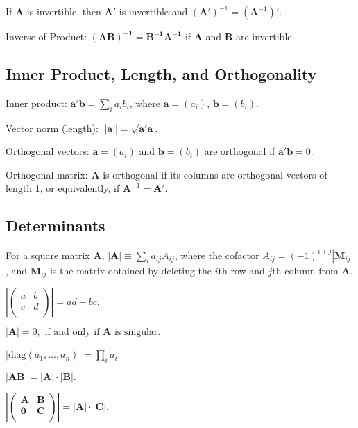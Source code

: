 \btheo
If ${\mathbf A}$ is invertible, then $\mathbf{A'}$ is invertible and $(\mathbf{A'})^{-1} = (\mathbf{A}^{-1})'$.
\etheo

\btheo
Inverse of Product: $\mathbf{(AB)^{-1}=B^{-1}A^{-1}}$ if $\mathbf A$
and $\mathbf B$ are invertible.
\etheo

\newpage
\subsection{Inner Product, Length, and Orthogonality}

\bdefi
Inner product: $\mathbf{a'b}=\sum_i a_i b_i$, where
$\mathbf{a}=(a_i)$, $\mathbf{b}=(b_i)$.
\esdefi

\bsdefi
Vector norm (length): $\mathbf{||a||=\sqrt{a'a}}$.
\esdefi

\bsdefi
Orthogonal vectors: $\mathbf{a}=(a_i)$ and $\mathbf{b}=(b_i)$ are
orthogonal if $\mathbf{a'b}=0$.
\esdefi

\bsdefi
Orthogonal matrix: $\mathbf A$ is orthogonal if its columns are
orthogonal vectors of length 1, or equivalently, if
$\mathbf{A}^{-1}=\mathbf{A}'$.
\edefi


\subsection{Determinants}

\bdefi
For a square matrix $\mathbf A$, $|\mathbf{A}|\equiv \sum_i
a_{ij}A_{ij}$, where the cofactor $A_{ij}=(-1)^{i+j}|\mathbf M_{ij}|$,
and $\mathbf M_{ij}$ is the matrix obtained by deleting the $i$th row
and $j$th column from $\mathbf A$.
\esdefi

\btheo
$\left|\left(\begin{array}{cc} a & b \\ c & d \\ \end{array}
\right)\right|= ad-bc.$
\estheo

\bstheo
$ |\mathbf{A}|=0, \mbox{ if and only if } \mathbf{A} \mbox{ is
singular}.$
\estheo

\bstheo
$|\mathrm{diag}(a_1,\ldots,a_n)|=\prod_i a_i$.
\estheo

\bstheo
$ |\mathbf{AB}| = |\mathbf A| \cdot |\mathbf B|.$
\estheo

\bstheo
$\left|\left(\begin{array}{cc} \mathbf{A} & \mathbf{B} \\ \mathbf{0} &
\mathbf{C} \\ \end{array}\right)\right|= |\mathbf A| \cdot |\mathbf
C|.$
\etheo

